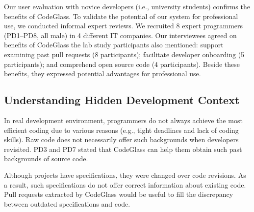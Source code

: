 Our user evaluation with novice developers (i.e., university students) confirms the benefits of CodeGlass.
To validate the potential of our system for professional use, we conducted informal expert reviews.
We recruited 8 expert programmers (PD1--PD8, all male) in 4 different IT companies.
Our interviewees agreed on benefits of CodeGlass the lab study participants also mentioned: support examining past pull requests (8 participants); facilitate developer onboarding (5 participants); and comprehend open source code (4 participants).
Beside these benefits, they expressed potential advantages for professional use.

\subsection*{Understanding Hidden Development Context}

In real development environment, programmers do not always achieve the most efficient coding due to various reasons (e.g., tight deadlines and lack of coding skills).
Raw code does not necessarily offer such backgrounds when developers revisited.
PD3 and PD7 stated that CodeGlass can help them obtain such past backgrounds of source code.





Although projects have specifications, they were changed over code revisions.
As a result, such specifications do not offer correct information about existing code.
Pull requests extracted by CodeGlass would be useful to fill the discrepancy between outdated specifications and code.

